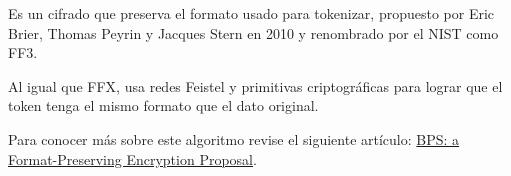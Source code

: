 %
%

Es un cifrado que preserva el formato usado para tokenizar,
propuesto por Eric Brier, Thomas Peyrin y Jacques Stern en 2010
y renombrado por el NIST como FF3.

Al igual que FFX, usa redes Feistel y primitivas criptográficas
para lograr que el token tenga el mismo formato que el dato
original.

Para conocer más sobre este algoritmo revise el siguiente
artículo:
\href{https://pdfs.semanticscholar.org/0be5/d4c77e333d78ddab5c4bf55d15649a660771.pdf}
{BPS: a Format-Preserving Encryption Proposal}.
